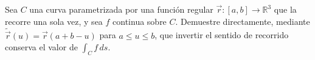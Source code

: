 Sea $C$ una curva parametrizada por una función regular $\vec r:[a,b]\to\mathbb R^3$ que la recorre una sola vez, y sea $f$ continua sobre $C$. Demuestre directamente, mediante $\widetilde{\vec r}(u)=\vec r(a+b-u)$ para $a\leq u\leq b$, que invertir el sentido de recorrido conserva el valor de $\int_C f\,ds$.
